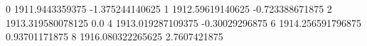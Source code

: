 0 1911.9443359375 -1.375244140625
1 1912.59619140625 -0.723388671875
2 1913.319580078125 0.0
4 1913.019287109375 -0.30029296875
6 1914.256591796875 0.93701171875
8 1916.080322265625 2.7607421875

